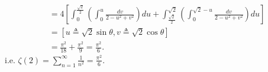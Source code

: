 {\begin{minipage}{0.95\textwidth}
\begin{sol*}
\begin{equation*}
\begin{split}
            &= 4\left[ \int_{0}^{\frac{\sqrt{2}}{2}} \left( \int_{0}^{u} \frac{dv}{2-u^2+v^2} \right) du + \int_{\frac{\sqrt{2}}{2}}^{\sqrt{2}} \left( \int_{0}^{\sqrt{2}-u} \frac{dv}{2-u^2+v^2} \right) du \right] \\
            &= [u\triangleq\sqrt{2}\sin \theta, v\triangleq\sqrt{2}\cos \theta] \\
            &= \frac{\pi^2}{18} + \frac{\pi^2}{9} = \frac{\pi^2}{6}.
        \end{split}
    \end{equation*}
    i.e. $\zeta(2)=\sum\limits_{n=1}^{\infty}\frac{1}{n^2}=\frac{\pi^2}{6}$.
\end{sol*}
\end{minipage}}

%